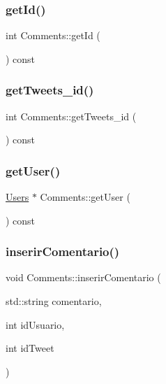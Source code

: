 \mbox{\label{class_comments_a5e6142cc7d1af69d82c4f3e237df082b}} 
\subsubsection{\texorpdfstring{get\+Id()}{getId()}}
{\footnotesize\ttfamily int Comments\+::get\+Id (\begin{DoxyParamCaption}{ }\end{DoxyParamCaption}) const}

\mbox{\label{class_comments_acc817e8cea26fbd0060cc82ab0dbd50b}} 
\subsubsection{\texorpdfstring{get\+Tweets\+\_\+id()}{getTweets\_id()}}
{\footnotesize\ttfamily int Comments\+::get\+Tweets\+\_\+id (\begin{DoxyParamCaption}{ }\end{DoxyParamCaption}) const}

\mbox{\label{class_comments_a22549ffe1f558a1cbe9fe2ca8a5917ff}} 
\subsubsection{\texorpdfstring{get\+User()}{getUser()}}
{\footnotesize\ttfamily \hyperlink{class_users}{Users} $\ast$ Comments\+::get\+User (\begin{DoxyParamCaption}{ }\end{DoxyParamCaption}) const}

\mbox{\label{class_comments_aec43404bd4520072a9e2a934b978a1f4}} 
\subsubsection{\texorpdfstring{inserir\+Comentario()}{inserirComentario()}}
{\footnotesize\ttfamily void Comments\+::inserir\+Comentario (\begin{DoxyParamCaption}\item[{std\+::string}]{comentario,  }\item[{int}]{id\+Usuario,  }\item[{int}]{id\+Tweet }\end{DoxyParamCaption})}

